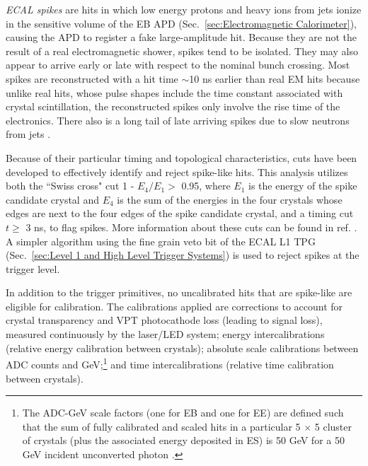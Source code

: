\documentclass[dissertation.tex]{subfiles}
\begin{document}
\marginpar{\textcolor{blue}{Added this paragraph and the next about spikes}}\textit{ECAL spikes} are hits in which low energy protons and heavy ions from jets ionize in the sensitive volume of the EB APD (Sec.~\ref{sec:Electromagnetic Calorimeter}), causing the APD to register a fake large-amplitude hit.  Because they are not the result of a real electromagnetic shower, spikes tend to be isolated.  They may also appear to arrive early or late with respect to the nominal bunch crossing.  Most spikes are reconstructed with a hit time $\sim$10 ns earlier than real EM hits because unlike real hits, whose pulse shapes include the time constant associated with crystal scintillation, the reconstructed spikes only involve the rise time of the electronics.  There also is a long tail of late arriving spikes due to slow neutrons from jets \cite{EGM_10_002}.

Because of their particular timing and topological characteristics, cuts have been developed to effectively identify and reject spike-like hits.  This analysis utilizes both the ``Swiss cross" cut 1 - $E_{4}/E_{1} >$ 0.95, where $E_{1}$ is the energy of the spike candidate crystal and $E_{4}$ is the sum of the energies in the four crystals whose edges are next to the four edges of the spike candidate crystal, and a timing cut $t \geq$ 3 ns, to flag spikes.  More information about these cuts can be found in ref. \cite{EGM_10_002}.  A simpler algorithm using the fine grain veto bit of the ECAL L1 TPG (Sec.~\ref{sec:Level 1 and High Level Trigger Systems}) is used to reject spikes at the trigger level.

In addition to the trigger primitives, no uncalibrated hits that are spike-like are eligible for calibration.  The calibrations applied are corrections to account for crystal transparency and VPT photocathode loss (leading to signal loss), measured continuously by the laser/LED system; energy intercalibrations (relative energy calibration between crystals); absolute scale calibrations between ADC counts and GeV;\footnote{The ADC-GeV scale factors (one for EB and one for EE) are defined such that the sum of fully calibrated and scaled hits in a particular 5 $\times$ 5 cluster of crystals (plus the associated energy deposited in ES) is 50 GeV for a 50 GeV incident unconverted photon \cite{calibration_IN}.} and time intercalibrations (relative time calibration between crystals).
\end{document}

